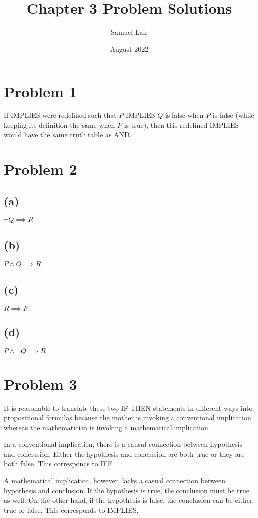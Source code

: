 \documentclass{article}
\title{Chapter 3 Problem Solutions}
\author{Samuel Lair}
\date{August 2022}
\begin{document}
\maketitle
\tableofcontents

\pagebreak

\section{Problem 1}
If IMPLIES were redefined such that $P$ IMPLIES $Q$ is false when $P$ is false (while keeping its definition the same when $P$ is true), then this redefined IMPLIES would have the same truth table as AND.

\pagebreak

\section{Problem 2}
\subsection{(a)}
$\neg Q \implies R$
\subsection{(b)}
$P \land Q \implies R$
\subsection{(c)}
$R \implies P$
\subsection{(d)}
$P \land \neg Q \implies R$

\pagebreak

\section{Problem 3}
It is reasonable to translate these two IF-THEN statements in different ways into propositional formulas because the mother is invoking a conventional implication whereas the mathematician is invoking a mathematical implication.

In a conventional implication, there is a causal connection between hypothesis and conclusion. Either the hypothesis and conclusion are both true or they are both false. This corresponds to IFF.

A mathematical implication, however, lacks a casual connection between hypothesis and conclusion. If the hypothesis is true, the conclusion must be true as well.  On the other hand, if the hypothesis is false, the conclusion can be either true or false. This corresponds to IMPLIES.
\end{document}
